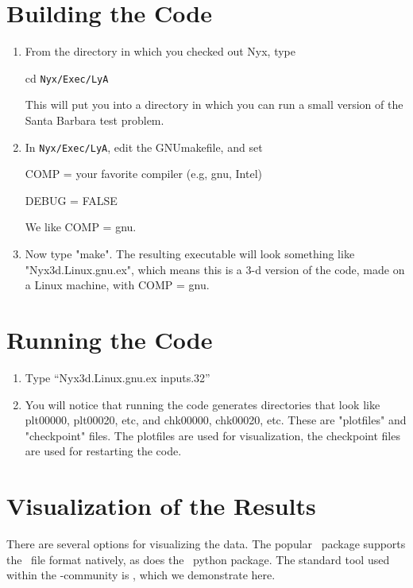 \section{Building the Code}

\begin{enumerate}

\item From the directory in which you checked out Nyx, type

cd {\tt Nyx/Exec/LyA}

This will put you into a directory in which you can run a small
version of the Santa Barbara test problem.

\item In {\tt Nyx/Exec/LyA}, edit the GNUmakefile, and set

COMP = your favorite compiler (e.g, gnu, Intel)

DEBUG = FALSE

We like COMP = gnu.

\item Now type "make". The resulting executable will look something like 
"Nyx3d.Linux.gnu.ex", which means this is a 3-d version of the code, 
made on a Linux machine, with COMP = gnu.

\end{enumerate}

\section{Running the Code}

\begin{enumerate}

\item Type ``Nyx3d.Linux.gnu.ex inputs.32''

\item You will notice that running the code generates directories that look like 
plt00000, plt00020, etc, and chk00000, chk00020, etc. These are "plotfiles" and 
"checkpoint" files. The plotfiles are used for visualization, the checkpoint files are 
used for restarting the code.

\end{enumerate}

\section{Visualization of the Results}

There are several options for visualizing the data.  The popular
\visit\ package supports the \amrex\ file format natively, as does
the \yt\ python package.  The standard tool used within the
\boxlib-community is \amrvis, which we demonstrate here.

